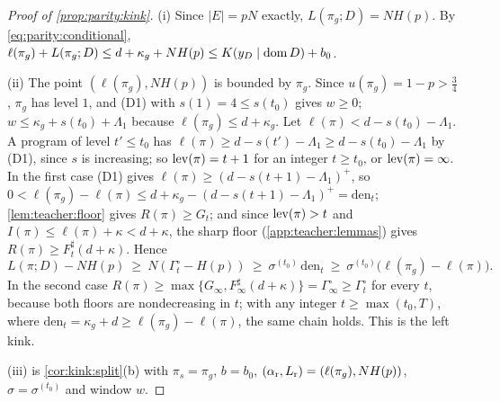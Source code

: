 \begin{proof}[Proof of \cref{prop:parity:kink}]
(i) Since $|E|=pN$ exactly, $L(\pi_g;D)=NH(p)$. By \eqref{eq:parity:conditional}, $\ell(\pi_g)+L(\pi_g;D)\le d+\kappa_g+NH(p)\le K(y_D\mid\operatorname{dom} D)+b_0$.

(ii) The point $(\ell(\pi_g),NH(p))$ is bounded by $\pi_g$. Since $u(\pi_g)=1-p>\frac34$, $\pi_g$ has level $1$, and (D1) with $s(1)=4\le s(t_0)$ gives $w\ge0$; $w\le\kappa_g+s(t_0)+\Lambda_1$ because $\ell(\pi_g)\le d+\kappa_g$. Let $\ell(\pi)<d-s(t_0)-\Lambda_1$. A program of level $t'\le t_0$ has $\ell(\pi)\ge d-s(t')-\Lambda_1\ge d-s(t_0)-\Lambda_1$ by (D1), since $s$ is increasing; so $\operatorname{lev}(\pi)=t+1$ for an integer $t\ge t_0$, or $\operatorname{lev}(\pi)=\infty$. In the first case (D1) gives $\ell(\pi)\ge(d-s(t+1)-\Lambda_1)^+$, so $0<\ell(\pi_g)-\ell(\pi)\le d+\kappa_g-(d-s(t+1)-\Lambda_1)^+=\mathrm{den}_t$; \cref{lem:teacher:floor} gives $R(\pi)\ge G_t$; and since $\operatorname{lev}(\pi)>t$ and $I(\pi)\le\ell(\pi)+\kappa<d+\kappa$, the sharp floor (\cref{app:teacher:lemmas}) gives $R(\pi)\ge F^\sharp_t(d+\kappa)$. Hence
\[
L(\pi;D)-NH(p)\ \ge\ N(\Gamma^\circ_t-H(p))\ \ge\ \sigma^{(t_0)}\,\mathrm{den}_t\ \ge\ \sigma^{(t_0)}\big(\ell(\pi_g)-\ell(\pi)\big).
\]
In the second case $R(\pi)\ge\max\{G_\infty,F^\sharp_\infty(d+\kappa)\}=\Gamma^\circ_\infty\ge\Gamma^\circ_t$ for every $t$, because both floors are nondecreasing in $t$; with any integer $t\ge\max(t_0,T)$, where $\mathrm{den}_t=\kappa_g+d\ge\ell(\pi_g)-\ell(\pi)$, the same chain holds. This is the left kink.

(iii) is \cref{cor:kink:split}(b) with $\pi_s=\pi_g$, $b=b_0$, $(\alpha_{\rm r},L_{\rm r})=(\ell(\pi_g),NH(p))$, $\sigma=\sigma^{(t_0)}$ and window $w$.
\end{proof}


